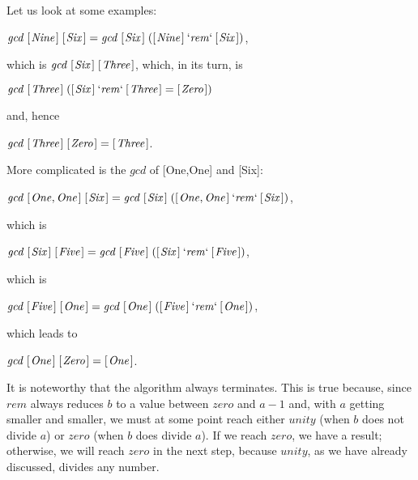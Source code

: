 \documentclass{scrreprt}
\newcommand{\Conid}[1]{\mathit{#1}}
\newcommand{\Varid}[1]{\mathit{#1}}
\begin{document}
Let us look at some examples:

\ensuremath{\Varid{gcd}\;[\mskip1.5mu \Conid{Nine}\mskip1.5mu]\;[\mskip1.5mu \Conid{Six}\mskip1.5mu]\mathrel{=}\Varid{gcd}\;[\mskip1.5mu \Conid{Six}\mskip1.5mu]\;([\mskip1.5mu \Conid{Nine}\mskip1.5mu]\mathbin{\Varid{`rem`}}[\mskip1.5mu \Conid{Six}\mskip1.5mu])},

which is \ensuremath{\Varid{gcd}\;[\mskip1.5mu \Conid{Six}\mskip1.5mu]\;[\mskip1.5mu \Conid{Three}\mskip1.5mu]}, 
which, in its turn, is

\ensuremath{\Varid{gcd}\;[\mskip1.5mu \Conid{Three}\mskip1.5mu]\;([\mskip1.5mu \Conid{Six}\mskip1.5mu]\mathbin{\Varid{`rem`}}[\mskip1.5mu \Conid{Three}\mskip1.5mu]\mathrel{=}[\mskip1.5mu \Conid{Zero}\mskip1.5mu])} 

and, hence

\ensuremath{\Varid{gcd}\;[\mskip1.5mu \Conid{Three}\mskip1.5mu]\;[\mskip1.5mu \Conid{Zero}\mskip1.5mu]\mathrel{=}[\mskip1.5mu \Conid{Three}\mskip1.5mu]}.

More complicated is the \ensuremath{\Varid{gcd}} of [One,One] and [Six]:

\ensuremath{\Varid{gcd}\;[\mskip1.5mu \Conid{One},\Conid{One}\mskip1.5mu]\;[\mskip1.5mu \Conid{Six}\mskip1.5mu]\mathrel{=}\Varid{gcd}\;[\mskip1.5mu \Conid{Six}\mskip1.5mu]\;([\mskip1.5mu \Conid{One},\Conid{One}\mskip1.5mu]\mathbin{\Varid{`rem`}}[\mskip1.5mu \Conid{Six}\mskip1.5mu])}, 

which is

\ensuremath{\Varid{gcd}\;[\mskip1.5mu \Conid{Six}\mskip1.5mu]\;[\mskip1.5mu \Conid{Five}\mskip1.5mu]\mathrel{=}\Varid{gcd}\;[\mskip1.5mu \Conid{Five}\mskip1.5mu]\;([\mskip1.5mu \Conid{Six}\mskip1.5mu]\mathbin{\Varid{`rem`}}[\mskip1.5mu \Conid{Five}\mskip1.5mu])}, 

which is

\ensuremath{\Varid{gcd}\;[\mskip1.5mu \Conid{Five}\mskip1.5mu]\;[\mskip1.5mu \Conid{One}\mskip1.5mu]\mathrel{=}\Varid{gcd}\;[\mskip1.5mu \Conid{One}\mskip1.5mu]\;([\mskip1.5mu \Conid{Five}\mskip1.5mu]\mathbin{\Varid{`rem`}}[\mskip1.5mu \Conid{One}\mskip1.5mu])}, 

which leads to

\ensuremath{\Varid{gcd}\;[\mskip1.5mu \Conid{One}\mskip1.5mu]\;[\mskip1.5mu \Conid{Zero}\mskip1.5mu]\mathrel{=}[\mskip1.5mu \Conid{One}\mskip1.5mu]}.

It is noteworthy
that the algorithm always terminates.
This is true because, since \ensuremath{\Varid{rem}} always reduces $b$
to a value between \ensuremath{\Varid{zero}} and $a - 1$ and,
with $a$ getting smaller and smaller,
we must at some point reach either \ensuremath{\Varid{unity}} 
(when $b$ does not divide $a$)
or \ensuremath{\Varid{zero}} (when $b$ does divide $a$). 
If we reach \ensuremath{\Varid{zero}}, we have a result;
otherwise, we will reach \ensuremath{\Varid{zero}} in the next step,
because \ensuremath{\Varid{unity}}, as we have already discussed, divides any number.
\end{document}
